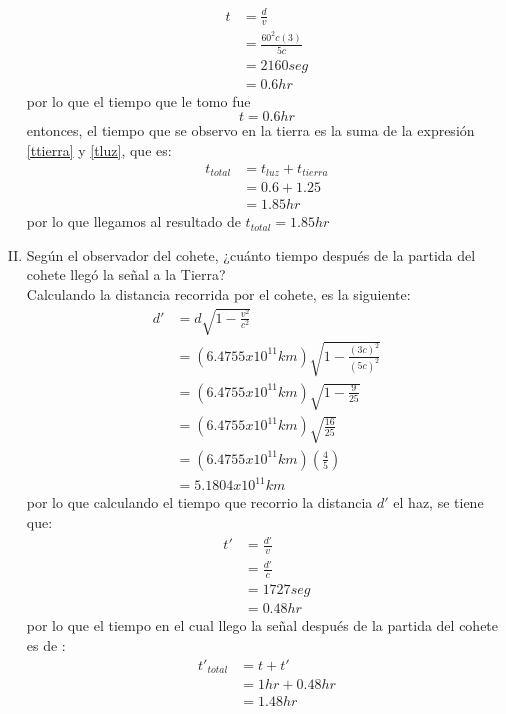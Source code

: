 \documentclass[12pt,letterpaper]{report}
\begin{document}
\begin{enumerate}[I)]
    \begin{align*}
        t   &= \frac{d}{v}\\
            &=\frac{60^2 c(3)}{5c}\\
            &=2160 seg\\
            & = 0.6 hr
    \end{align*}
    por lo que el tiempo que le tomo fue 
    \begin{equation}
        \label{tluz}
        t= 0.6 hr
    \end{equation}
    entonces, el tiempo que se observo en la tierra es la suma de la expresión \ref{ttierra} y \ref{tluz}, que es:
    \begin{align*}
        t_{total}   &=t_{luz}+t_{tierra}\\
                    &=0.6+1.25\\
                    &=1.85 hr
    \end{align*}
    por lo que llegamos al resultado de $t_{total}=1.85 hr$
    \item Según el observador del cohete, ¿cuánto tiempo después de la partida del cohete llegó la señal a la Tierra?\\
    Calculando la distancia recorrida por el cohete, es la siguiente:\\
    \begin{align*}
        {d}'&=d\sqrt{1-\frac{v^2}{c^2}}\\
            &=\left(6.4755x10^{11} km  \right)\sqrt{1-\frac{(3c)^2}{(5c)^2}}\\
            &=\left(6.4755x10^{11} km  \right)\sqrt{1-\frac{9}{25}}\\
            &=\left(6.4755x10^{11} km  \right)\sqrt{\frac{16}{25}}\\
            &=\left(6.4755x10^{11} km  \right)\left(\frac{4}{5}\right)\\
            &=5.1804x10^{11} km
    \end{align*}
    por lo que calculando el tiempo que recorrio la distancia ${d}'$ el haz, se tiene que:
    \begin{align*}
        {t}'&=\frac{{d}'}{v}\\
            &=\frac{{d}'}{c}\\
            &=1727seg\\
            &=0.48hr
    \end{align*}
    por lo que el tiempo en el cual llego la señal después de la partida del cohete es de :
    \begin{align*}
        {t}'_{total}  &=t+{t}'\\
                    &=1hr+0.48hr\\
                    &=1.48 hr
    \end{align*}
\end{enumerate}
\end{document}
